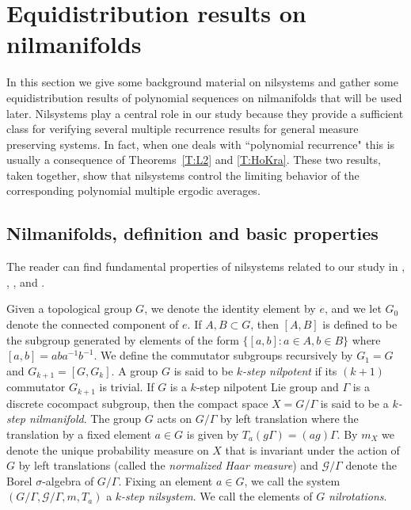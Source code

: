 \documentclass[11pt]{amsart}
\newcommand{\G}{\mathcal{G}}
\newcommand{\gG}{\Gamma}
\theoremstyle{plain}
\theoremstyle{definition}
\theoremstyle{remark}
\begin{document}
\section{Equidistribution results on
  nilmanifolds}\label{S:backgroundnil}
In this section we give some background material on nilsystems and
gather some equidistribution results of polynomial sequences on
nilmanifolds that will be used later.  Nilsystems play a central role
in our study because they provide a sufficient class for verifying
several multiple recurrence results for general measure preserving
systems. In fact, when one deals with ``polynomial recurrence"
  this is usually a consequence of Theorems~\ref{T:L2} and
  \ref{T:HoKra}. These two results, taken together, show that nilsystems
  control the limiting behavior of the corresponding  polynomial
  multiple ergodic averages.
\subsection{Nilmanifolds, definition and basic
  properties}\label{SS:basic}
The reader can find fundamental properties of nilsystems related to
our study in \cite{AGH}, \cite{Pa}, \cite{Les}, and \cite{L2}.

Given a topological group $G$, we denote the identity element by $e$,
and we let $G_0$ denote the connected component of $e$.  If $A,
B\subset G$, then $[A,B]$ is defined to be the subgroup generated by
elements of the form $\{[a,b]:a\in A, b\in B\}$ where $[a,b]=ab
a^{-1}b^{-1}$. We define the commutator subgroups recursively by
$G_1=G$ and $G_{k+1}=[G, G_{k}]$. A group $G$ is said to be {\it
  $k$-step nilpotent} if its $(k+1)$ commutator $G_{k+1}$ is trivial.
If $G$ is a $k$-step nilpotent Lie group and $\gG$ is a discrete
cocompact subgroup, then the compact space $X = G/\gG$ is said to be a
{\it $k$-step nilmanifold}.  The group $G$ acts on $G/\gG$ by left
translation where the translation by a fixed element $a\in G$ is given
by $T_{a}(g\gG) = (ag) \gG$. By $m_X$ we  denote the unique probability
measure on $X$ that is invariant under the action of $G$ by left
translations (called the {\it normalized Haar measure}) and $\G/\gG$ denote the
Borel $\sigma$-algebra of $G/\gG$. Fixing an element $a\in G$, we call
the system $(G/\gG, \G/\gG, m, T_{a})$ a {\it $k$-step nilsystem}. We
call the elements of $G$ \emph{nilrotations}.
\end{document}
